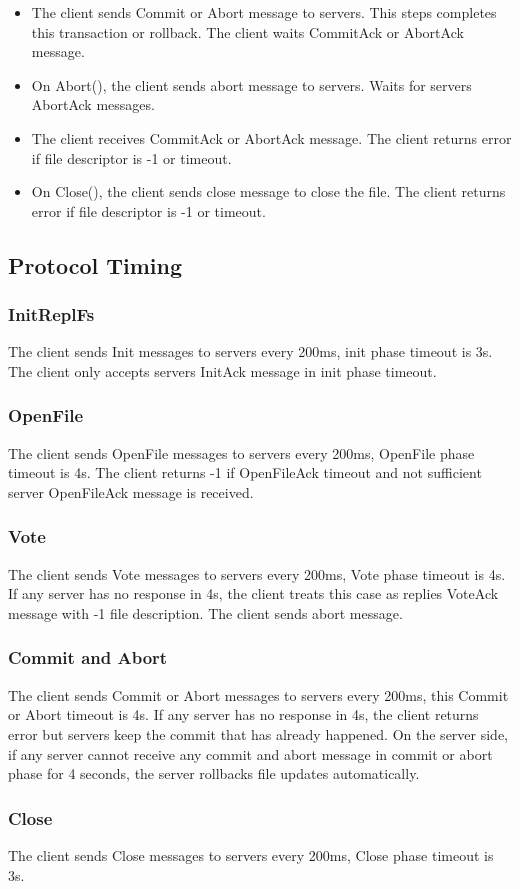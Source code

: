 \documentclass[12pt,fleqn]{article}
\begin{document}
\begin{itemize}
	\item The client sends Commit or Abort message to servers. This steps completes this transaction or rollback. The client waits CommitAck or AbortAck message.
	\item On Abort(), the client sends abort message to servers. Waits for servers AbortAck messages.
	\item The client receives CommitAck or AbortAck message. The client returns error if file descriptor is -1 or timeout.
	\item  On Close(), the client sends close message to close the file. The client returns error if file descriptor is -1 or timeout.
\end{itemize}

\subsection{Protocol Timing}
\subsubsection{InitReplFs}
The client sends Init messages to servers every 200ms, init phase timeout is 3s. The client only accepts servers InitAck message in init phase timeout.

\subsubsection{OpenFile}
The client sends OpenFile messages to servers every 200ms, OpenFile phase timeout is 4s. The client returns -1 if OpenFileAck timeout and not sufficient server OpenFileAck message is received.

\subsubsection{Vote}
The client sends Vote messages to servers every 200ms, Vote phase timeout is 4s. If any server has no response in 4s, the client treats this case as replies VoteAck message with -1 file description. The client sends abort message.

\subsubsection{Commit and Abort}
The client sends Commit or Abort messages to servers every 200ms, this Commit or Abort timeout is 4s. If any server has no response in 4s, the client returns error but servers keep the commit that has already happened. On the server side, if any server cannot receive any commit and abort message in commit or abort phase for 4 seconds, the server rollbacks file updates automatically.
 
 \subsubsection{Close}
The client sends Close messages to servers every 200ms, Close phase timeout is 3s. 
 
\end{document}
